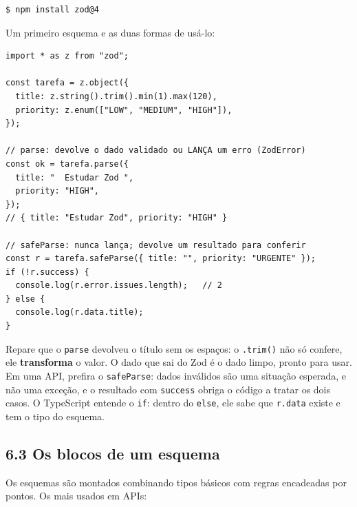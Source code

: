 \begin{codigo}
\begin{Verbatim}[breaklines=true, breaksymbolleft={}, fontsize=\footnotesize]
$ npm install zod@4
\end{Verbatim}
\end{codigo}

Um primeiro esquema e as duas formas de usá-lo:

\begin{codigo}
\begin{Verbatim}[breaklines=true, breaksymbolleft={}, fontsize=\footnotesize]
import * as z from "zod";

const tarefa = z.object({
  title: z.string().trim().min(1).max(120),
  priority: z.enum(["LOW", "MEDIUM", "HIGH"]),
});

// parse: devolve o dado validado ou LANÇA um erro (ZodError)
const ok = tarefa.parse({
  title: "  Estudar Zod ",
  priority: "HIGH",
});
// { title: "Estudar Zod", priority: "HIGH" }

// safeParse: nunca lança; devolve um resultado para conferir
const r = tarefa.safeParse({ title: "", priority: "URGENTE" });
if (!r.success) {
  console.log(r.error.issues.length);   // 2
} else {
  console.log(r.data.title);
}
\end{Verbatim}
\end{codigo}

Repare que o \texttt{parse} devolveu o título sem os espaços: o \texttt{.trim()} não só confere, ele \textbf{transforma} o valor. O dado que sai do Zod é o dado limpo, pronto para usar. Em uma API, prefira o \texttt{safeParse}: dados inválidos são uma situação esperada, e não uma exceção, e o resultado com \texttt{success} obriga o código a tratar os dois casos. O TypeScript entende o \texttt{if}: dentro do \texttt{else}, ele sabe que \texttt{r.data} existe e tem o tipo do esquema.

\subsection{6.3 Os blocos de um esquema}

Os esquemas são montados combinando tipos básicos com regras encadeadas por pontos. Os mais usados em APIs:

